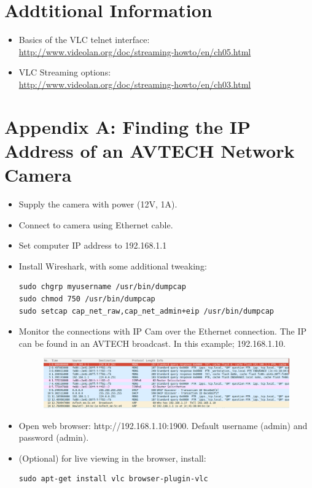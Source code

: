 \documentclass[a4paper,11pt]{report}
\begin{document}
\section{Addtitional Information}
\begin{itemize}
  \item Basics of the VLC telnet interface: \\ \url{http://www.videolan.org/doc/streaming-howto/en/ch05.html}
  \item VLC Streaming options: \\ \url{http://www.videolan.org/doc/streaming-howto/en/ch03.html}
\end{itemize}

\newpage
\section*{Appendix A: Finding the IP Address of an AVTECH Network Camera} 
\begin{itemize}
  \item Supply the camera with power (12V, 1A).
  \item Connect to camera using Ethernet cable.
  \item Set computer IP address to 192.168.1.1
  \item Install Wireshark, with some additional tweaking:
\begin{lstlisting}
sudo chgrp myusername /usr/bin/dumpcap
sudo chmod 750 /usr/bin/dumpcap
sudo setcap cap_net_raw,cap_net_admin+eip /usr/bin/dumpcap
\end{lstlisting}
\item Monitor the connections with IP Cam over the Ethernet connection. The IP can be found in an AVTECH broadcast. In this example; 192.168.1.10. 
 \begin{figure}[h]
   \begin{center}
     \includegraphics[scale=0.34]{IP}
   \end{center}
 \end{figure}
\item Open web browser: http://192.168.1.10:1900. Default username (admin) and password (admin).
\item (Optional) for live viewing in the browser, install:
\begin{lstlisting}
sudo apt-get install vlc browser-plugin-vlc
\end{lstlisting}

\end{itemize}
\end{document}
